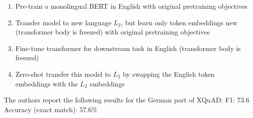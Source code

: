 \begin{enumerate}
    \item Pre-train a monolingual BERT in English with original pretraining objectives
    \item Transfer model to new language $L_2$, but learn only token embeddings new (transformer body is freezed) with original pretraining objectives
    \item Fine-tune transformer for downstream task in English (transformer body is freezed)
    \item Zero-shot transfer this model to $L_2$ by swapping the English token embeddings with the $L_2$ embeddings
\end{enumerate}

The authors report the following results for the German part of XQuAD:
F1: 73.6
Accuracy (exact match): 57.6\%

